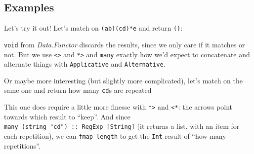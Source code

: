 \documentclass[]{article}
\newenvironment{Shaded}{}{}
\newcommand{\CharTok}[1]{\textcolor[rgb]{0.25,0.44,0.63}{#1}}
\newcommand{\CommentTok}[1]{\textcolor[rgb]{0.38,0.63,0.69}{\textit{#1}}}
\newcommand{\DataTypeTok}[1]{\textcolor[rgb]{0.56,0.13,0.00}{#1}}
\newcommand{\FunctionTok}[1]{\textcolor[rgb]{0.02,0.16,0.49}{#1}}
\newcommand{\NormalTok}[1]{#1}
\newcommand{\OtherTok}[1]{\textcolor[rgb]{0.00,0.44,0.13}{#1}}
\newcommand{\StringTok}[1]{\textcolor[rgb]{0.25,0.44,0.63}{#1}}
\begin{document}
\hypertarget{examples}{%
\subsection{Examples}\label{examples}}

Let's try it out! Let's match on \texttt{(a\textbar{}b)(cd)*e} and return
\texttt{()}:

\begin{Shaded}
\end{Shaded}

\texttt{void} from \emph{Data.Functor} discards the results, since we only care
if it matches or not. But we use \texttt{\textless{}\textbar{}\textgreater{}}
and \texttt{*\textgreater{}} and \texttt{many} exactly how we'd expect to
concatenate and alternate things with \texttt{Applicative} and
\texttt{Alternative}.

Or maybe more interesting (but slightly more complicated), let's match on the
same one and return how many \texttt{cd}s are repeated

\begin{Shaded}
\end{Shaded}

This one does require a little more finesse with \texttt{*\textgreater{}} and
\texttt{\textless{}*}: the arrows point towards which result to ``keep''. And
since \texttt{many\ (string\ "cd")\ ::\ RegExp\ {[}String{]}} (it returns a
list, with an item for each repetition), we can \texttt{fmap\ length} to get the
\texttt{Int} result of ``how many repetitions''.
\end{document}
